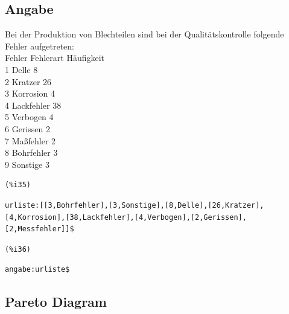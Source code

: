 \documentclass[12pt]{article}
\begin{document}
\subsection{Angabe }


Bei der Produktion von Blechteilen sind bei der Qualitätskontrolle folgende Fehler aufgetreten: \\
Fehler      Fehlerart   Häufigkeit \\
    1       Delle        8 \\
    2       Kratzer     26 \\
    3       Korrosion    4 \\
    4       Lackfehler  38 \\
    5       Verbogen     4 \\ 
    6       Gerissen     2 \\
    7       Maßfehler    2 \\
    8       Bohrfehler   3 \\
    9       Sonstige     3 \\

\noindent
\begin{minipage}[t]{8ex}{\color{red}\bf
\begin{verbatim}
(%i35) 
\end{verbatim}}
\end{minipage}
\begin{minipage}[t]{\textwidth}{\color{blue}
\begin{verbatim}
urliste:[[3,Bohrfehler],[3,Sonstige],[8,Delle],[26,Kratzer],[4,Korrosion],[38,Lackfehler],[4,Verbogen],[2,Gerissen],[2,Messfehler]]$
\end{verbatim}}
\end{minipage}


\noindent
\begin{minipage}[t]{8ex}{\color{red}\bf
\begin{verbatim}
(%i36) 
\end{verbatim}}
\end{minipage}
\begin{minipage}[t]{\textwidth}{\color{blue}
\begin{verbatim}
angabe:urliste$
\end{verbatim}}
\end{minipage}


\subsection{Pareto Diagram}
\end{document}
